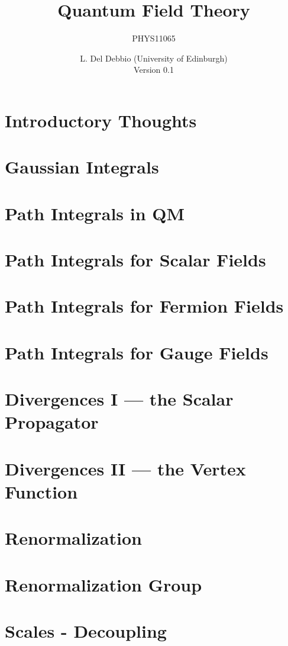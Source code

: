 \documentclass[11pt]{scrreprt}
\title{Quantum Field Theory}
\subtitle{PHYS11065}
\author{L. Del Debbio (University of Edinburgh)\\
  Version 0.1}
\begin{document}

\clearemptydoublepage
\tableofcontents
\clearemptydoublepage


\chapter*{Introductory Thoughts}
\label{chap:intro}


\chapter{Gaussian Integrals}
\label{chap:lec0}


\chapter{Path Integrals in QM}
\label{chap:lec1}


\chapter{Path Integrals for Scalar Fields}
\label{cha:path-integr-scal}



\chapter{Path Integrals for Fermion Fields}
\label{cha:path-integr-ferm}


\chapter{Path Integrals for Gauge Fields}
\label{cha:path-integrals-gauge}



\chapter{Divergences I --- the Scalar Propagator}
\label{cha:divergences-i-scalar}



\chapter{Divergences II --- the Vertex Function}
\label{cha:diverg-ii-vert}



\chapter{Renormalization}
\label{cha:renormalization}
% 


\chapter{Renormalization Group}
\label{cha:renorm-group}

\chapter{Scales - Decoupling}
\label{cha:scales-decoupling}

\printindex
\end{document}
